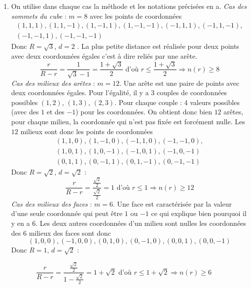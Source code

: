 \begin{enumerate}
\begin{enumerate}
 \item On utilise dans chaque cas la méthode et les notations précisées en a.\newline
\emph{Cas des sommets du cube} : $m=8$ avec les points de coordonnées
\begin{multline*}
 (1,1,1), (1,1,-1), (1,-1,1), (1,-1,-1), (-1,1,1), (-1,1,-1),\\ (-1,-1,1), (-1,-1,-1)
\end{multline*}
Donc $R=\sqrt{3}$, $d=2$ . La plus petite distance est réalisée pour deux points avec deux coordonnées égales c'est à dire reliés par une arête.
\begin{displaymath}
 \frac{r}{R-r}=\frac{1}{\sqrt{3}-1}= \frac{1+\sqrt{3}}{2}
\text{ d'où }
r\leq \frac{1+\sqrt{3}}{2} \Rightarrow n(r) \geq 8
\end{displaymath}
\emph{Cas des milieux des arêtes} : $m=12$. Une arête est une paire de points avec deux coordonnées égales. Pour l'égalité, il y a 3 couples de coordonnées possibles $(1,2)$, $(1,3)$, $(2,3)$. Pour chaque couple : 4 valeurs possibles (avec des $1$ et des $-1$) pour les coordonnées. On obtient donc bien $12$ arêtes, pour chaque milieu, la coordonnée qui n'est pas fixée est forcément nulle. Les $12$ milieux sont donc les points de coordonnées
\begin{multline*}
 (1,1,0), (1,-1,0), (-1,1,0), (-1,-1,0),\\ (1,0,1), (1,0,-1), (-1,0,1), (-1,0,-1)\\
(0,1,1), (0,-1,1), (0,1,-1), (0,-1,-1)
\end{multline*}
Donc $R=\sqrt{2}$, $d=\sqrt{2}$ : 
\begin{displaymath}
 \frac{r}{R-r}=\frac{\frac{\sqrt{2}}{2}}{\frac{\sqrt{2}}{2}}= 1
\text{ d'où }
r\leq 1 \Rightarrow n(r) \geq 12
\end{displaymath}
\emph{Cas des milieux des faces} : $m=6$. Une face est caractérisée par la valeur d'une seule coordonnée qui peut être $1$ ou $-1$ ce qui explique bien pourquoi il y en a $6$. Les deux autres coordonnées d'un milieu sont nulles les coordonnées des $6$ milieux des faces  sont donc
\begin{displaymath}
 (1,0,0), (-1,0,0), (0,1,0), (0,-1,0), (0,0,1), (0,0,-1)
\end{displaymath}
 Donc $R=1$, $d=\sqrt{2}$ :
\end{enumerate}
\begin{displaymath}
 \frac{r}{R-r}=\frac{\frac{\sqrt{2}}{2}}{1-\frac{\sqrt{2}}{2}}= 1+\sqrt{2}
\text{ d'où }
r\leq 1+\sqrt{2} \Rightarrow n(r) \geq 6
\end{displaymath}


\end{enumerate}
